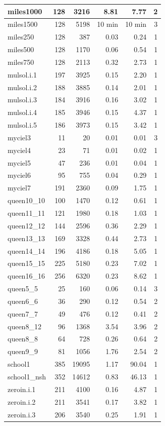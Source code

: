 \begin{table}[H]
\begin{tabular}{|l|r|r|r|r|r|}
miles1000 & 128 & 3216 & 8.81 & 7.77 & 2 \\ \hline
miles1500 & 128 & 5198 & 10 min & 10 min & 3 \\ \hline
miles250 & 128 & 387 & 0.03 & 0.24 & 1 \\ \hline
miles500 & 128 & 1170 & 0.06 & 0.54 & 1 \\ \hline
miles750 & 128 & 2113 & 0.32 & 2.73 & 1 \\ \hline
mulsol.i.1 & 197 & 3925 & 0.15 & 2.20 & 1 \\ \hline
mulsol.i.2 & 188 & 3885 & 0.14 & 2.01 & 1 \\ \hline
mulsol.i.3 & 184 & 3916 & 0.16 & 3.02 & 1 \\ \hline
mulsol.i.4 & 185 & 3946 & 0.15 & 4.37 & 1 \\ \hline
mulsol.i.5 & 186 & 3973 & 0.15 & 3.42 & 1 \\ \hline
myciel3 & 11 & 20 & 0.01 & 0.01 & 3 \\ \hline
myciel4 & 23 & 71 & 0.01 & 0.02 & 1 \\ \hline
myciel5 & 47 & 236 & 0.01 & 0.04 & 1 \\ \hline
myciel6 & 95 & 755 & 0.04 & 0.29 & 1 \\ \hline
myciel7 & 191 & 2360 & 0.09 & 1.75 & 1 \\ \hline
queen10\_10 & 100 & 1470 & 0.12 & 0.61 & 1 \\ \hline
queen11\_11 & 121 & 1980 & 0.18 & 1.03 & 1 \\ \hline
queen12\_12 & 144 & 2596 & 0.36 & 2.29 & 1 \\ \hline
queen13\_13 & 169 & 3328 & 0.44 & 2.73 & 1 \\ \hline
queen14\_14 & 196 & 4186 & 0.18 & 5.05 & 1 \\ \hline
queen15\_15 & 225 & 5180 & 0.23 & 7.02 & 1 \\ \hline
queen16\_16 & 256 & 6320 & 0.23 & 8.62 & 1 \\ \hline
queen5\_5 & 25 & 160 & 0.06 & 0.14 & 3 \\ \hline
queen6\_6 & 36 & 290 & 0.12 & 0.54 & 2 \\ \hline
queen7\_7 & 49 & 476 & 0.12 & 0.41 & 2 \\ \hline
queen8\_12 & 96 & 1368 & 3.54 & 3.96 & 2 \\ \hline
queen8\_8 & 64 & 728 & 0.26 & 0.64 & 2 \\ \hline
queen9\_9 & 81 & 1056 & 1.76 & 2.54 & 2 \\ \hline
school1 & 385 & 19095 & 1.17 & 90.04 & 1 \\ \hline
school1\_nsh & 352 & 14612 & 0.83 & 46.13 & 1 \\ \hline
zeroin.i.1 & 211 & 4100 & 0.16 & 4.87 & 1 \\ \hline
zeroin.i.2 & 211 & 3541 & 0.17 & 3.82 & 1 \\ \hline
zeroin.i.3 & 206 & 3540 & 0.25 & 1.91 & 1 \\ \hline
\end{tabular}
\end{table}


